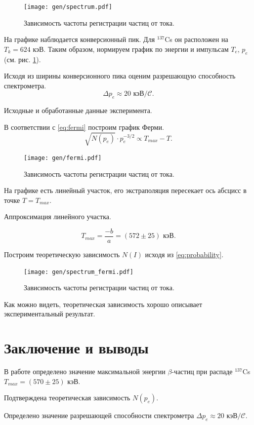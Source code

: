 \documentclass[12pt,a4paper]{article}
\newcommand{\figref}[1]{(см. рис. \ref{#1})}
\begin{document}
	\begin{figure}[H]
		\centering
		\texttt{[image: gen/spectrum.pdf]}
		\caption{Зависимость частоты регистрации частиц от тока.}
		\label{fig:exp_spectrum}
	\end{figure}

	На графике наблюдается конверсионный пик. Для $^{137}$Cs он расположен на $T_k = 624$ кэВ. Таким образом, нормируем график по энергии и импульсам $T_e$, $p_e$ \figref{fig:exp_spectrum}.
	
	Исходя из ширины конверсионного пика оценим разрешающую способность спектрометра.
	$$ \Delta p_e \approx 20 \text{ кэВ}/\mathcal{C}.$$
	
	
	\begin{table}[H]
		\footnotesize
		
		\caption{Исходные и обработанные данные эксперимента.}
		\label{tab:data}
	\end{table}

	В соответствии с \eqref{eq:fermi} построим график Ферми.
	$$ \sqrt{N(p_e)} \cdot p_e^{-3/2} \propto T_{max} - T.$$

	\begin{figure}[H]
		\centering
		\texttt{[image: gen/fermi.pdf]}
		\caption{Зависимость частоты регистрации частиц от тока.}
		\label{fig:exp_fermi}
	\end{figure}
	
	На графике есть линейный участок, его экстраполяция пересекает ось абсцисс в точке $T = T_{max}$.
	
	\begin{table}[H]
		\footnotesize
		
		\caption{Аппроксимация линейного участка.}
		\label{tab:mnk}
	\end{table}
	
	$$T_{max} = \frac{-b}{a} = (572 \pm 25) \text{ кэВ}.$$
	
	Построим теоретическую зависимость $N(I)$ исходя из \eqref{eq:probability}.
	
	\begin{figure}[H]
		\centering
		\texttt{[image: gen/spectrum\_fermi.pdf]}
		\caption{Зависимость частоты регистрации частиц от тока.}
		\label{fig:th_spectrum}
	\end{figure}
	
	Как можно видеть, теоретическая зависимость хорошо описывает экспериментальный результат.
	
	\section*{Заключение и выводы}
	
	В работе определено значение максимальной энергии $\beta$-частиц при распаде $^{137}$Cs $T_{max} = (570 \pm 25)$ кэВ.
	
	Подтверждена теоретическая зависимость $N(p_e)$.
	
	Определено значение разрешающей способности спектрометра $\Delta p_e \approx 20 \text{ кэВ}/{\mathcal{C}}$.
\end{document}
